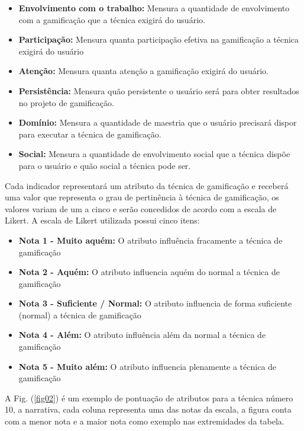 \begin{itemize}
\item  \textbf {Envolvimento com o trabalho:}  Mensura a quantidade de envolvimento com a gamificação que a técnica exigirá do usuário.
\item  \textbf {Participação:}  Mensura quanta participação efetiva na gamificação a técnica exigirá do usuário
\item  \textbf {Atenção:}  Mensura quanta atenção a gamificação exigirá do usuário.
\item  \textbf {Persistência:} Mensura quão persistente o usuário será para obter resultados no projeto de gamificação. 
\item  \textbf {Domínio:} Mensura a quantidade de maestria que o usuário precisará dispor para executar a técnica de gamificação. 
\item  \textbf{Social:} Mensura a quantidade de envolvimento social que a técnica dispõe para o usuário e quão social a técnica pode ser.
\end{itemize}


Cada indicador representará um atributo da técnica de gamificação e receberá uma valor que representa o grau de pertinência à técnica de gamificação, os valores variam de um a cinco e serão concedidos de acordo com a escala de Likert. A escala de Likert utilizada possui cinco itens: 

\begin{itemize}
\item  \textbf {Nota 1 - Muito aquém:} O atributo influência fracamente a técnica de gamificação
\item  \textbf {Nota 2 - Aquém:} O atributo influencia aquém do normal a técnica de gamificação
\item  \textbf {Nota 3 - Suficiente / Normal:} O atributo influencia de forma suficiente (normal) a técnica de gamificação
\item  \textbf {Nota 4 - Além:} O atributo influência além da normal a técnica de gamificação
\item  \textbf {Nota 5 - Muito além:} O atributo influencia plenamente a técnica de gamificação
\end{itemize}


A Fig. (\ref{fig02}) é um exemplo de pontuação de atributos para a técnica número 10, a narrativa, cada coluna representa uma das notas da escala, a figura conta com a menor nota e a maior nota como exemplo nas extremidades da tabela.

